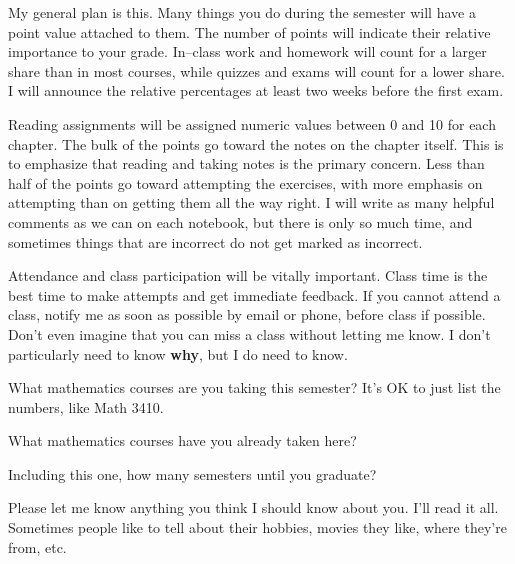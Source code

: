   My general plan is this.  Many things you do during the semester will have a point value attached to them.  The number of points will indicate their relative importance to your grade.  In--class work and homework will count for a larger share than in most courses, while quizzes and exams will count for a lower share.  I will announce the relative percentages at least two weeks before the first exam.

Reading assignments will be assigned numeric values between 0 and 10 for each chapter.
The bulk of the points go toward the notes on the chapter itself.
This is to emphasize that reading and taking notes is the primary concern.
Less than half of the points go toward attempting the exercises, with more emphasis on attempting than on getting them all the way right.
I will write as many helpful comments as we can on each notebook, but there is only so much time, and sometimes things that are incorrect do not get marked as incorrect.


\vspace*{1in}

 Attendance and class participation will be vitally important.
Class time is the best time to make attempts and get immediate feedback.
If you cannot attend a class, notify me as soon as possible by email or phone, before class if possible.
Don't even imagine that you can miss a class without letting me know.
I don't particularly need to know {\bf why}, but I do need to know.


\blist{0.8in}
\item What mathematics courses are you taking this semester?
It's OK to just list the numbers, like Math 3410.

\item What mathematics courses have you already taken here?

\item Including this one, how many semesters until you graduate?

\item Please let me know anything you think I should know about you.  I'll read it all.  Sometimes people like to tell about their hobbies, movies they like, where they're from, etc.

\elist

\vfill          %
